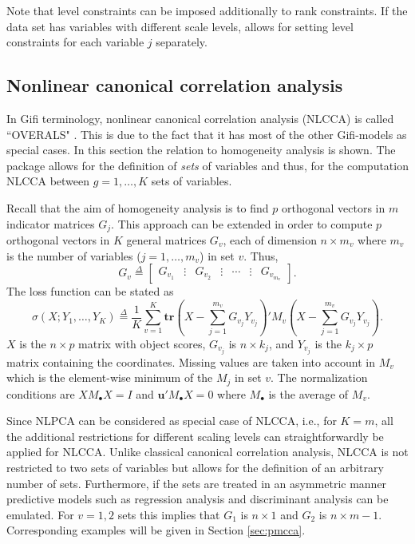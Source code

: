 \documentclass[article]{Z}
\newcommand{\defi}{\mathop{=}\limits^{\Delta}}
\begin{document}
Note that level constraints can be imposed additionally to rank constraints. If the data set has variables with different scale levels,  allows for setting level constraints for each variable $j$ separately. 

\subsection{Nonlinear canonical correlation analysis}
In Gifi terminology, nonlinear canonical correlation analysis (NLCCA) is called ``OVERALS" \citep{vanderBurg+deLeeuw+Verdegaal:88, vanderBurg+deLeeuw+Dijksterhuis:94}. This is due to the fact that it has most of the other Gifi-models as special cases. 
In this section the relation to homogeneity analysis is shown. The  package allows for the definition of \emph{sets} of variables and thus, for the computation NLCCA between $g = 1,\ldots,K$ sets of variables. 

Recall that the aim of homogeneity analysis is to find $p$ orthogonal vectors in $m$ indicator matrices $G_j$. 
This approach can be extended in order to compute $p$ orthogonal vectors in $K$ general matrices $G_v$, each of dimension $n \times m_v$ where $m_v$ is the number of variables ($j = 1,\ldots ,m_v$) in set $v$. Thus, 
\begin{equation}
G_v\defi\begin{bmatrix}G_{v_1}&\vdots&G_{v_2}&\vdots&\cdots&\vdots&G_{v_{m_v}}\end{bmatrix}.
\end{equation}
The loss function can be stated as
\begin{equation}
\label{eq:lcca}
\sigma(X;Y_1,\ldots,Y_K)\defi\frac{1}{K}\sum_{v=1}^K\mathbf{tr}\left(X-\sum_{j=1}^{m_v}G_{v_j}Y_{v_j}\right)'M_v\left(X-\sum_{j=1}^{m_v}G_{v_j}Y_{v_j}\right).
\end{equation}
$X$ is the $n \times p$ matrix with object scores, $G_{v_j}$ is $n \times k_j$, and $Y_{v_j}$ is the $k_j \times p$ matrix containing the coordinates. Missing values are taken into account in $M_v$ which is the element-wise minimum of the $M_j$ in set $v$. The normalization conditions are $XM_\bullet X = I$ and $\mathbf{u}'M_\bullet X=0$ where $M_\bullet$ is the average of $M_v$.

Since NLPCA can be considered as special case of NLCCA, i.e., for $K=m$, all the additional restrictions for different scaling levels can straightforwardly be applied for NLCCA. 
Unlike classical canonical correlation analysis, NLCCA is not restricted to two sets of variables but allows for the definition of an arbitrary number of sets. Furthermore, if the sets are treated in an asymmetric manner predictive models such as regression analysis and discriminant analysis can be emulated. For $v=1,2$ sets this implies that $G_1$ is $n \times 1$ and $G_2$ is $n \times m-1$. Corresponding examples will be given in Section \ref{sec:pmcca}.
\end{document}
